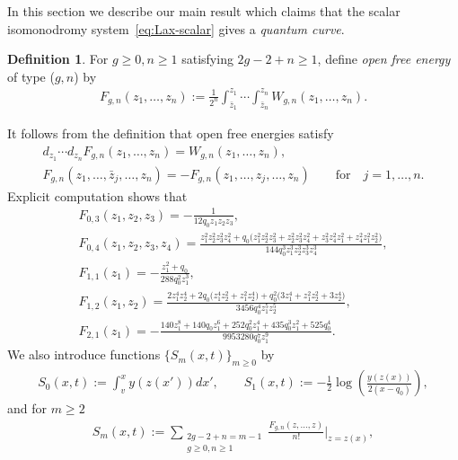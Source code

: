 \documentclass[pdftex]{sigma}
\theoremstyle{definition}
\newtheorem{Def}[thm]{Definition}
\numberwithin{equation}{section}
\begin{document}
In this section we describe our main result which claims
that the scalar isomonodromy system~\eqref{eq:Lax-scalar}
gives a {\em quantum curve}.

\begin{Def}
For $g \ge 0, n \ge 1$ satisfying $2g-2+n \ge 1$,
def\/ine {\em open free energy} of type ($g,n$) by
\begin{gather} \label{eq:open-Fgn}
F_{g,n}(z_{1},\dots,z_{n}) :=
\frac{1}{2^{n}} \int^{z_{1}}_{\bar{z}_{1}}\cdots
\int^{z_{n}}_{\bar{z}_{n}} W_{g,n}(z_{1},\dots,z_{n}).
\end{gather}
\end{Def}

It follows from the def\/inition that open free energies satisfy
\begin{gather*}
d_{z_{1}}\cdots d_{z_{n}} F_{g,n}(z_{1},\dots,z_{n})   =
W_{g,n}(z_{1},\dots,z_{n}), \\
F_{g,n}(z_{1},\dots,\bar{z}_{j}, \dots,z_{n})   =
- F_{g,n}(z_{1},\dots, z_{j}, \dots,z_{n})
\qquad \text{for} \quad j=1,\dots,n.
\end{gather*}
Explicit computation shows that
\begin{gather*}
F_{0,3}(z_{1},z_{2},z_{3})   =   -\frac{1}{12q_{0}z_{1}z_{2}z_{3}}, \\
F_{0,4}(z_{1},z_{2},z_{3},z_{4})   =
\frac{z_{1}^{2}z_{2}^{2}z_{3}^{2}z_{4}^{2} + q_{0}\bigl(
z_{1}^{2}z_{2}^{2}z_{3}^{2} + z_{2}^{2}z_{3}^{2}z_{4}^{2} +
z_{3}^{2}z_{4}^{2}z_{1}^{2} + z_{4}^{2}z_{1}^{2}z_{2}^{2} \bigr)}
{144q_{0}^{3}z_{1}^{3}z_{2}^{3}z_{3}^{3}z_{4}^{3}},
\\
F_{1,1}(z_{1})  =  -\frac{z_{1}^{2}+q_{0}}{288q_{0}^{2} z_{1}^{3}}, \\
%
F_{1,2}(z_{1},z_{2}) =
\frac{2z_{1}^{4}z_{2}^{4} +
2q_{0}\bigl( z_{1}^{4}z_{2}^{2} + z_{1}^{2}z_{2}^{4} \bigr) +
q_{0}^{2}\bigl( 3z_{1}^{4} + z_{1}^{2}z_{2}^{2} + 3z_{2}^{4} \bigr)}
{3456q_{0}^{4}z_{1}^{5}z_{2}^{5}}, \\
%
F_{2,1}(z_{1})  =
-\frac{140z_{1}^{8} + 140 q_{0} z_{1}^6 + 252 q_{0}^{2} z_{1}^4
+ 435 q_{0}^{3} z_{1}^2 + 525 q_{0}^{4}}
{9953280 q_{0}^{7} z_{1}^{9}}.
\end{gather*}
We also introduce functions $\{ S_{m}(x,t) \}_{m \ge 0}$ by
\begin{gather*} %
S_{0}(x,t) := \int^{x}_{v} y(z(x'))dx', \qquad
S_{1}(x,t) := -\frac{1}{2} \log \left(\frac{y(z(x))}{2(x-q_{0})}
\right),
\end{gather*}
and for $m \ge 2$
\begin{gather*} %
S_{m}(x,t) := \sum_{\substack{2g-2+n=m-1 \\ g\ge0, n\ge 1}}
\frac{F_{g,n}(z,\dots,z)}{n!} \biggr|_{z=z(x)},
\end{gather*}
\end{document}
